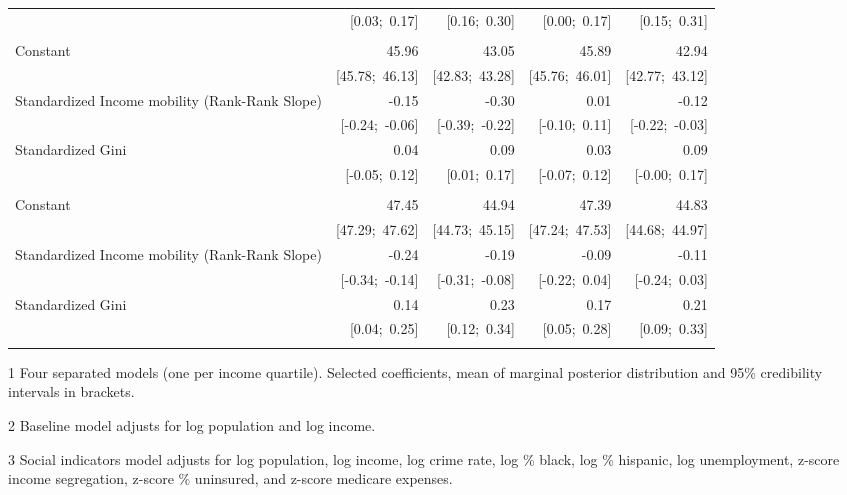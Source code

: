 \begin{table}[htp]
\begin{threeparttable}
\begin{tabular}{l D{.}{.}{5.11} D{.}{.}{5.11} D{.}{.}{5.11} D{.}{.}{5.11} }
                                               & [0.03;\ 0.17]   & [0.16;\ 0.30]   & [0.00;\ 0.17]   & [0.15;\ 0.31]   \\
 \addlinespace[10pt]
 \\
\addlinespace[10pt]
 Constant                                       & 45.96           & 43.05           & 45.89           & 42.94           \\
                                               & [45.78;\ 46.13] & [42.83;\ 43.28] & [45.76;\ 46.01] & [42.77;\ 43.12] \\
Standardized Income mobility (Rank-Rank Slope) & -0.15           & -0.30           & 0.01            & -0.12           \\
                                               & [-0.24;\ -0.06] & [-0.39;\ -0.22] & [-0.10;\ 0.11]  & [-0.22;\ -0.03] \\
Standardized Gini                              & 0.04            & 0.09            & 0.03            & 0.09            \\
                                               & [-0.05;\ 0.12]  & [0.01;\ 0.17]   & [-0.07;\ 0.12]  & [-0.00;\ 0.17]  \\
 \addlinespace[10pt]
 \\
\addlinespace[10pt]
 Constant                                       & 47.45           & 44.94           & 47.39           & 44.83           \\
                                               & [47.29;\ 47.62] & [44.73;\ 45.15] & [47.24;\ 47.53] & [44.68;\ 44.97] \\
Standardized Income mobility (Rank-Rank Slope) & -0.24           & -0.19           & -0.09           & -0.11           \\
                                               & [-0.34;\ -0.14] & [-0.31;\ -0.08] & [-0.22;\ 0.04]  & [-0.24;\ 0.03]  \\
Standardized Gini                              & 0.14            & 0.23            & 0.17            & 0.21            \\
                                               & [0.04;\ 0.25]   & [0.12;\ 0.34]   & [0.05;\ 0.28]   & [0.09;\ 0.33]   \\
 \addlinespace[5pt]
\bottomrule
\end{tabular}
\begin{tablenotes}[flushleft]
\scriptsize
\item [1] Four separated models (one per income quartile). Selected coefficients, mean of marginal posterior distribution and 95\% credibility intervals in brackets.
\item [2] Baseline model adjusts for log population and log income.
\item [3] Social indicators model adjusts for log population, log income, log crime rate, log \% black, log \% hispanic, log unemployment, z-score income segregation, z-score \% uninsured, and z-score medicare expenses.
\end{tablenotes}
\end{threeparttable}
\end{table}
